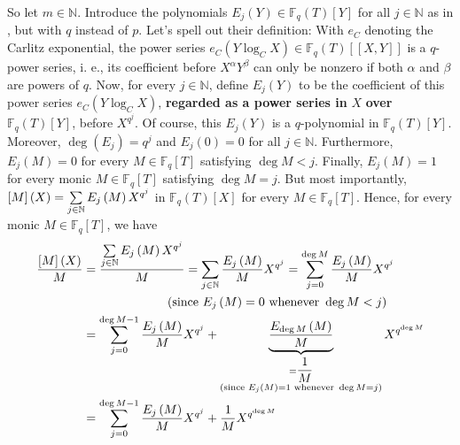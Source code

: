 \documentclass[numbers=enddot,12pt,final,onecolumn,notitlepage]{scrartcl}%
\theoremstyle{definition}
\let\sumnonlimits\sum
\renewcommand{\sum}{\sumnonlimits\limits}
\begin{document}
So let $m\in\mathbb{N}$. Introduce the polynomials $E_{j}\left(  Y\right)
\in\mathbb{F}_{q}\left(  T\right)  \left[  Y\right]  $ for all $j\in
\mathbb{N}$ as in \cite[Section 8]{kc-carlitz}, but with $q$ instead of $p$.
Let's spell out their definition: With $e_{C}$ denoting the Carlitz
exponential, the power series $e_{C}\left(  Y\log_{C}X\right)  \in
\mathbb{F}_{q}\left(  T\right)  \left[  \left[  X,Y\right]  \right]  $ is a
$q$-power series, i. e., its coefficient before $X^{\alpha}Y^{\beta}$ can only
be nonzero if both $\alpha$ and $\beta$ are powers of $q$. Now, for every
$j\in\mathbb{N}$, define $E_{j}\left(  Y\right)  $ to be the coefficient of
this power series $e_{C}\left(  Y\log_{C}X\right)  $, \textbf{regarded as a
power series in }$X$ \textbf{over }$\mathbb{F}_{q}\left(  T\right)  \left[
Y\right]  $, before $X^{q^{j}}$. Of course, this $E_{j}\left(  Y\right)  $ is
a $q$-polynomial in $\mathbb{F}_{q}\left(  T\right)  \left[  Y\right]  $.
Moreover, $\deg\left(  E_{j}\right)  =q^{j}$ and $E_{j}\left(  0\right)  =0$
for all $j\in\mathbb{N}$. Furthermore, $E_{j}\left(  M\right)  =0$ for every
$M\in\mathbb{F}_{q}\left[  T\right]  $ satisfying $\deg M<j$. Finally,
$E_{j}\left(  M\right)  =1$ for every monic $M\in\mathbb{F}_{q}\left[
T\right]  $ satisfying $\deg M=j$. But most importantly, $\left[  M\right]
\left(  X\right)  =\sum\limits_{j\in\mathbb{N}}E_{j}\left(  M\right)
X^{q^{j}}$ in $\mathbb{F}_{q}\left(  T\right)  \left[  X\right]  $ for every
$M\in\mathbb{F}_{q}\left[  T\right]  $. Hence, for every monic $M\in
\mathbb{F}_{q}\left[  T\right]  $, we have%
\begin{align}
\dfrac{\left[  M\right]  \left(  X\right)  }{M}  &  =\dfrac{\sum
\limits_{j\in\mathbb{N}}E_{j}\left(  M\right)  X^{q^{j}}}{M}=\sum
\limits_{j\in\mathbb{N}}\dfrac{E_{j}\left(  M\right)  }{M}X^{q^{j}}%
=\sum\limits_{j=0}^{\deg M}\dfrac{E_{j}\left(  M\right)  }{M}X^{q^{j}%
}\nonumber\\
&  \ \ \ \ \ \ \ \ \ \ \ \ \ \ \ \ \ \ \ \ \left(  \text{since }E_{j}\left(
M\right)  =0\text{ whenever }\deg M<j\right) \nonumber\\
&  =\sum\limits_{j=0}^{\deg M-1}\dfrac{E_{j}\left(  M\right)  }{M}X^{q^{j}%
}+\underbrace{\dfrac{E_{\deg M}\left(  M\right)  }{M}}_{\substack{=\dfrac
{1}{M}\\\text{(since }E_{j}\left(  M\right)  =1\text{ whenever }\deg
M=j\text{)}}}X^{q^{\deg M}}\nonumber\\
&  =\sum\limits_{j=0}^{\deg M-1}\dfrac{E_{j}\left(  M\right)  }{M}X^{q^{j}%
}+\dfrac{1}{M}X^{q^{\deg M}} \label{pf.carlitzlog.lem2.5}%
\end{align}
\end{document}
